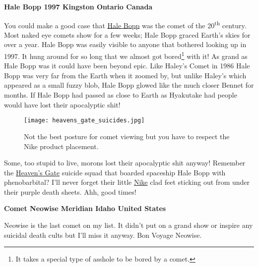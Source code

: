 \medskip

\noindent \textbf{Hale Bopp 1997 Kingston Ontario Canada}

\medskip

You could make a good case that
\href{https://en.wikipedia.org/wiki/Comet_Hale\%E2\%80\%93Bopp}{Hale
Bopp} was the comet of the 20\textsuperscript{th} century. Most naked
eye comets show for a few weeks; Hale Bopp graced Earth's skies for over
a year. Hale Bopp was easily visible to anyone that bothered looking up
in 1997. It hung around for so long that we almost got
bored\footnote{It takes a special type of asshole to be bored by a comet.
} with it! As grand as
Hale Bopp was it could have been beyond epic. Like Haley's Comet in 1986
Hale Bopp was very far from the Earth when it zoomed by, but unlike
Haley's which appeared as a small fuzzy blob, Hale Bopp glowed like the
much closer Bennet for months. If Hale Bopp had passed as close to Earth
as Hyakutake had people would have lost their apocalyptic shit!


\captionsetup[figure]{labelformat=empty}
\begin{SCfigure}
\centering
\texttt{[image: heavens\_gate\_suicides.jpg]}
\caption{Not the best posture for comet viewing but you have to respect
the Nike product placement.}
\label{fig:6024x0}
\end{SCfigure}

Some, too stupid to live, morons lost their apocalyptic shit anyway!
Remember the
\href{https://www.escondidograpevine.com/2020/03/25/20-years-ago-heavens-gate-couldnt-wait/}{Heaven's
Gate} suicide squad that boarded spaceship Hale Bopp with phenobarbital?
I'll never forget their little
\href{https://solecollector.com/news/2015/03/nike-decade-heavens-gate-sneakers}{Nike}
clad feet sticking out from under their purple death sheets. Ahh, good
times!

\medskip

\noindent \textbf{Comet Neowise Meridian Idaho United States}

\medskip

Neowise is the last comet on my list. It didn't put on a grand show or
inspire any suicidal death cults but I'll miss it anyway. Bon Voyage
Neowise.


